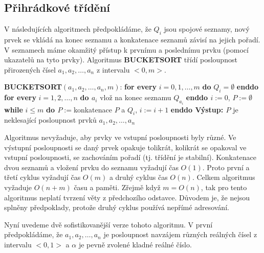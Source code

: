 \documentclass[a4paper,12pt]{article}
\begin{document}
\subsection{{Přihrádkové třídění}}

V následujících algoritmech 
před\-po\-klá\-dáme, že $Q_i$ jsou spojové seznamy, nový 
prvek se vkládá na konec seznamu a konkatenace 
seznamů závisí na jejich pořadí. V 
seznamech máme okamžitý přístup k prvnímu a poslednímu 
prvku (pomocí ukazatelů na tyto prvky). 
Algoritmus {\bf BUCKETSORT} třídí posloupnost přirozených 
čísel $a_1,a_2,\dots,a_n$ z intervalu $<0,m>$.

{\bf BUCKETSORT$(a_1,a_2,\dots,a_n,m)$}:\newline 
{\bf for every} $i=0,1,\dots,m$ {\bf do} $Q_i=\emptyset$ {\bf enddo\newline 
for every} $i=1,2,\dots,n$ {\bf do\newline 
\phantom{{\rm ---}}$a_i$} vlož na konec seznamu $Q_{a_i}$\newline 
{\bf enddo\newline 
$i:=0$}, $P:=\emptyset$\newline 
{\bf while} $i\le m$ {\bf do\newline 
\phantom{{\rm ---}}$P:=$}konkatenace $P$ a $Q_i$, $i:=i+1$\newline 
{\bf enddo\newline 
Výstup: $P$} je neklesající posloupnost prvků 
$a_1,a_2,\dots,a_n$

Algoritmus nevyžaduje, aby prvky ve 
vstupní posloupnosti by\-ly různé. Ve výstupní 
posloupnosti se daný prvek opakuje tolikrát, kolikrát se 
opakoval ve vstupní posloupnosti, se zachováním pořadí 
(tj. třídění je stabilní). 
Konkatenace dvou seznamů a vložení prvku do seznamu 
vyžadují čas $O(1)$. Proto první a třetí cyklus vyžadují 
čas $O(m)$ a druhý cyklus čas $O(n)$. Celkem 
algoritmus vyžaduje $O(n+m)$ času a paměti. Zřejmě když  
$m=O(n)$, tak pro tento algoritmus neplatí tvrzení věty z 
předchozího odstavce. 
Důvodem je, 
že nejsou splněny předpoklady, protože druhý cyklus 
používá nepřímé adresování.

Nyní uvedeme dvě sofistikovanější verze tohoto 
algoritmu. V první předpokládáme, že 
$a_1,a_2,\dots,a_n$ je posloupnost navzájem různých reálných 
čísel z intervalu $<0,1>$ a $\alpha$ je pevně zvolené kladné 
reálné číslo.
\end{document}
